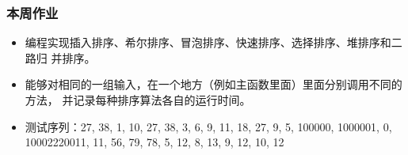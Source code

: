\begin{frame}[fragile]
  \frametitle{本周作业}
  \begin{itemize}
  \item 编程实现插入排序、希尔排序、冒泡排序、快速排序、选择排序、堆排序和二路归
    并排序。
  \item 能够对相同的一组输入，在一个地方（例如主函数里面）里面分别调用不同的方法，
    并记录每种排序算法各自的运行时间。
  \item 测试序列：27, 38, 1, 10, 27, 38, 3, 6, 9, 11, 18, 27, 9, 5, 100000,
    1000001, 0, 10002220011, 11, 56, 79, 78, 5, 12, 8, 13, 9, 12, 10, 12
  \end{itemize}
\end{frame}